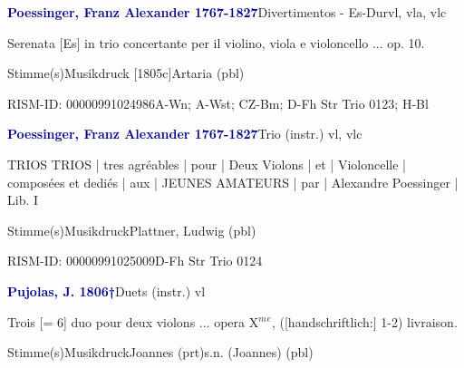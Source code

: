 \documentclass[twocolumn, 12pt]{book}
\begin{document}
\par \vspace{16pt} \textcolor{darkblue}{\textbf{Poessinger, Franz Alexander  1767-1827}}\hfillplus{\textbf{[315]}}\newline Divertimentos - Es-Dur\newline vl, vla, vlc
\par \begin{itshape}Serenata [Es] in trio concertante per il violino, viola e violoncello ... op. 10.\end{itshape} 
\par \textcolor{darkblue}{}  Stimme(s)\newline Musikdruck  [1805c]\newline Artaria  (pbl)
\par RISM-ID: 00000991024986\newline A-Wn; A-Wst; CZ-Bm; D-Fh  Str Trio 0123; H-Bl
\par \vspace{16pt} \textcolor{darkblue}{\textbf{Poessinger, Franz Alexander  1767-1827}}\hfillplus{\textbf{[316]}}\newline Trio (instr.) vl, vlc
\par \begin{itshape}TRIOS TRIOS | tres agréables | pour | Deux Violons | et | Violoncelle | composées et dediés | aux | JEUNES AMATEURS | par | Alexandre Poessinger | Lib. I\end{itshape} 
\par \textcolor{darkblue}{}  Stimme(s)\newline Musikdruck\newline Plattner, Ludwig  (pbl)
\par RISM-ID: 00000991025009\newline D-Fh  Str Trio 0124
\par \vspace{16pt} \textcolor{darkblue}{\textbf{Pujolas, J.  1806†}}\hfillplus{\textbf{[317]}}\newline Duets (instr.) vl
\par \begin{itshape}Trois [= 6] duo pour deux violons ... opera X$^m$$^e$, ([handschriftlich:] 1-2) livraison.\end{itshape} 
\par \textcolor{darkblue}{}  Stimme(s)\newline Musikdruck\newline Joannes  (prt)\newline s.n. (Joannes)  (pbl)
\end{document}
